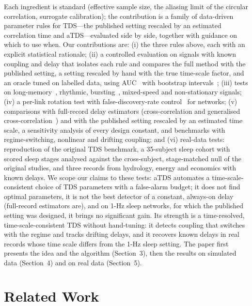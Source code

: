 \documentclass[11pt,a4paper]{article}
\begin{document}
Each ingredient is standard (effective sample size, the aliasing limit of the circular correlation, surrogate calibration); the contribution is a family of data-driven parameter rules for TDS---the published setting rescaled by an estimated correlation time and aTDS---evaluated side by side, together with guidance on which to use when. Our contributions are: (i) the three rules above, each with an explicit statistical rationale; (ii) a controlled evaluation on signals with known coupling and delay that isolates each rule and compares the full method with the published setting, a setting rescaled by hand with the true time-scale factor, and an oracle tuned on labelled data, using AUC~\cite{Hanley1982MeaningUse} with bootstrap intervals~\cite{Efron1979BootstrapMethods}; (iii) tests on long-memory~\cite{Davies1987TestsHurst,Peng1995QuantificationScaling}, rhythmic, bursting~\cite{Rulkov2002ModelingSpikingbursting}, mixed-speed and non-stationary signals; (iv) a per-link rotation test with false-discovery-rate control~\cite{Benjamini1995ControllingFalse} for networks; (v) comparisons with full-record delay estimators (cross-correlation and generalised cross-correlation~\cite{Knapp1976GeneralizedCorrelation,Carter1987CoherenceTime}) and with the published setting rescaled by an estimated time scale, a sensitivity analysis of every design constant, and benchmarks with regime-switching, nonlinear and drifting coupling; and (vi) real-data tests: reproduction of the original TDS benchmark, a 35-subject sleep cohort with scored sleep stages analysed against the cross-subject, stage-matched null of the original studies, and three records from hydrology, energy and economics with known delays. We scope our claims to these tests: aTDS automates a time-scale-consistent choice of TDS parameters with a false-alarm budget; it does not find optimal parameters, it is not the best detector of a constant, always-on delay (full-record estimators are), and on 1-Hz sleep networks, for which the published setting was designed, it brings no significant gain. Its strength is a time-resolved, time-scale-consistent TDS without hand-tuning: it detects coupling that switches with the regime and tracks drifting delays, and it recovers known delays in real records whose time scale differs from the 1-Hz sleep setting. The paper first presents the idea and the algorithm (Section~3), then the results on simulated data (Section~4) and on real data (Section~5).

\section{Related Work}
\label{sec:related_work}
\end{document}
